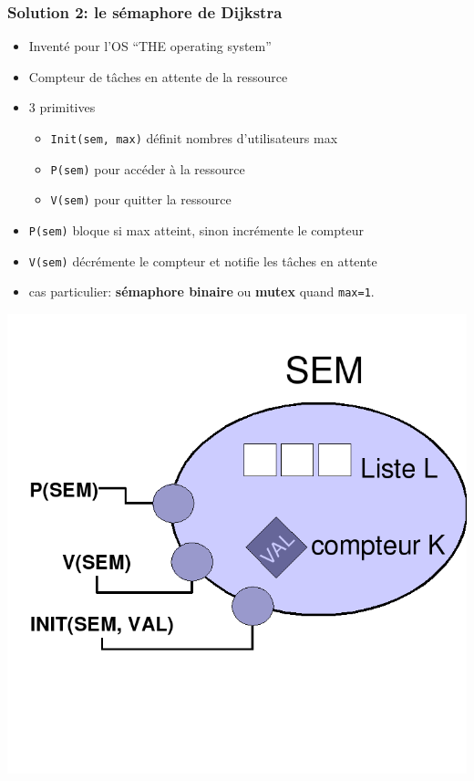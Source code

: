 \documentclass{beamer}
\begin{document}
\begin{frame}
  \frametitle{Solution 2: le \textbf{sémaphore} de Dijkstra}
  \begin{minipage}{.7\textwidth}
    \begin{itemize}
    \item Inventé pour l'OS ``THE operating system''
    \item Compteur de tâches en attente de la ressource
    \item 3 primitives
      \begin{itemize}
      \item \texttt{Init(sem, max)} définit nombres d'utilisateurs max
      \item \texttt{P(sem)} pour accéder à la ressource
      \item \texttt{V(sem)} pour quitter la ressource
      \end{itemize}
    \item \texttt{P(sem)} bloque si max atteint, sinon incrémente le compteur
    \item \texttt{V(sem)} décrémente le compteur et notifie les tâches en
      attente
    \item cas particulier: \textbf{sémaphore binaire} ou \textbf{mutex} quand \texttt{max=1}.
    \end{itemize}
  \end{minipage}
  \begin{minipage}{.28\textwidth}
    \includegraphics[width=.7\textwidth]{semaphore.png}
  \end{minipage}
\end{frame} %
\end{document}
